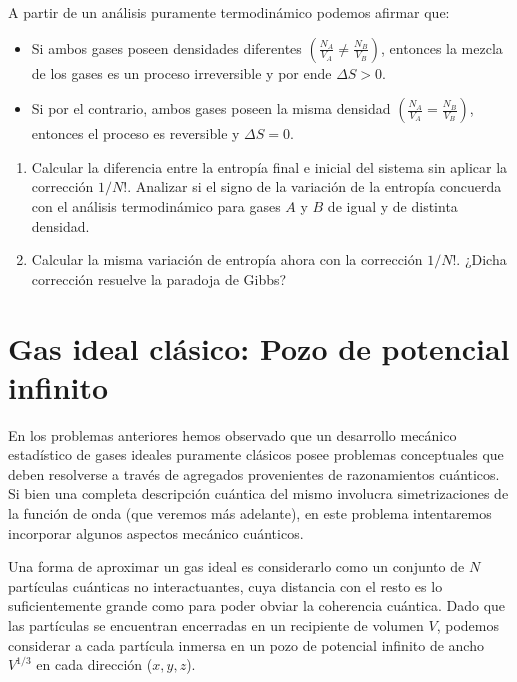 \documentclass[a4paper,11pt]{article}
\begin{document}
A partir de un análisis puramente termodinámico podemos afirmar que:

\begin{itemize}

\item{Si ambos gases poseen densidades diferentes
      $\left( \frac{N_A}{V_A} \neq \frac{N_B}{V_B} \right)$, entonces la 
      mezcla de los gases es un proceso irreversible y por ende
      $ \Delta S > 0 $.
      }

\item{Si por el contrario, ambos gases poseen la misma densidad
      $\left( \frac{N_A}{V_A} = \frac{N_B}{V_B} \right)$, entonces 
      el proceso es reversible y $ \Delta S = 0 $.
      }

\end{itemize}

\begin{enumerate}[label=(\alph*),
                  leftmargin=2\parindent,
                  rightmargin=2\parindent]

    \item{Calcular la diferencia entre la entropía final e inicial del 
          sistema sin aplicar la corrección $1/N!$.
          Analizar si el signo de la variación de la entropía 
          concuerda con el análisis termodinámico para gases $A$ y $B$ de 
          igual y de distinta densidad.}
    
    \item{Calcular la misma variación de entropía ahora con la 
          corrección $1/N!$. ¿Dicha corrección resuelve la paradoja 
          de Gibbs?}

\end{enumerate}


\section{Gas ideal clásico: Pozo de potencial infinito}

En los problemas anteriores hemos observado que un desarrollo mecánico 
estadístico de gases ideales puramente clásicos posee problemas 
conceptuales que deben resolverse a través de agregados provenientes 
de razonamientos cuánticos.
Si bien una completa descripción cuántica del mismo involucra 
simetrizaciones de la función de onda (que veremos más adelante), en 
este problema intentaremos incorporar algunos aspectos mecánico 
cuánticos.

Una forma de aproximar un gas ideal es considerarlo como un conjunto de 
$N$ partículas cuánticas no interactuantes, cuya distancia con el resto 
es lo suficientemente grande como para poder obviar la coherencia 
cuántica. Dado que las partículas se encuentran encerradas en un 
recipiente de volumen $V$, podemos considerar a cada partícula inmersa 
en un pozo de potencial infinito de ancho $V^{1/3}$ en cada dirección 
($x, y, z$).
\end{document}
